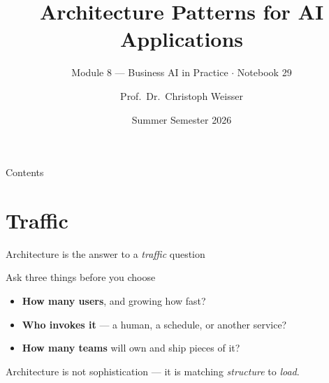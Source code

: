 \documentclass[aspectratio=169,11pt]{beamer}
\title{Architecture Patterns for AI Applications}
\subtitle{Module 8 --- Business AI in Practice $\cdot$ Notebook 29}
\author{Prof.\ Dr.\ Christoph Weisser}
\institute{HSBI}
\date{Summer Semester 2026}
\begin{document}
\begin{frame}\titlepage\end{frame}

\begin{frame}{Contents}
  \tableofcontents[hideallsubsections]
\end{frame}

\section{Traffic}
\begin{frame}{Architecture is the answer to a \emph{traffic} question}
  \begin{center}
  \end{center}
  \begin{block}{Ask three things before you choose}
    \begin{itemize}
      \item \textbf{How many users}, and growing how fast?
      \item \textbf{Who invokes it} --- a human, a schedule, or another service?
      \item \textbf{How many teams} will own and ship pieces of it?
    \end{itemize}
  \end{block}
  {\footnotesize Architecture is not sophistication --- it is matching \emph{structure} to \emph{load}.}
\end{frame}

\end{document}
